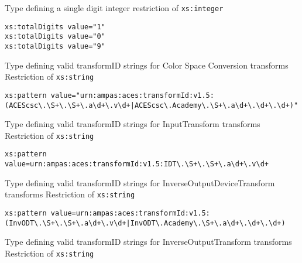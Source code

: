             {Type defining a single digit integer}
            {restriction of \texttt{xs:integer}}
                
            \begin{adjustwidth}{5mm}{}            
            \lstinline{xs:totalDigits value="1"} \\
            \lstinline{xs:totalDigits value="0"} \\
            \lstinline{xs:totalDigits value="9"}
        \end{adjustwidth}
        
            {Type defining valid transformID strings for Color Space Conversion transforms}
            {Restriction of \texttt{xs:string}}
            
            \begin{adjustwidth}{5mm}{}            
                \lstinline{xs:pattern value="urn:ampas:aces:transformId:v1.5:(ACEScsc\.\S+\.\S+\.a\d+\.v\d+|ACEScsc\.Academy\.\S+\.a\d+\.\d+\.\d+)"}
            \end{adjustwidth}

            {Type defining valid transformID strings for InputTransform transforms}
            {Restriction of \texttt{xs:string}}

            \begin{adjustwidth}{5mm}{}            
            \lstinline{xs:pattern value=urn:ampas:aces:transformId:v1.5:IDT\.\S+\.\S+\.a\d+\.v\d+}
            \end{adjustwidth}
            
            {Type defining valid transformID strings for InverseOutputDeviceTransform transforms}
            {Restriction of \texttt{xs:string}}

            \begin{adjustwidth}{5mm}{}            
            \lstinline{xs:pattern value=urn:ampas:aces:transformId:v1.5:(InvODT\.\S+\.\S+\.a\d+\.v\d+|InvODT\.Academy\.\S+\.a\d+\.\d+\.\d+)}
            \end{adjustwidth}
            
            {Type defining valid transformID strings for InverseOutputTransform transforms}
            {Restriction of \texttt{xs:string}}


